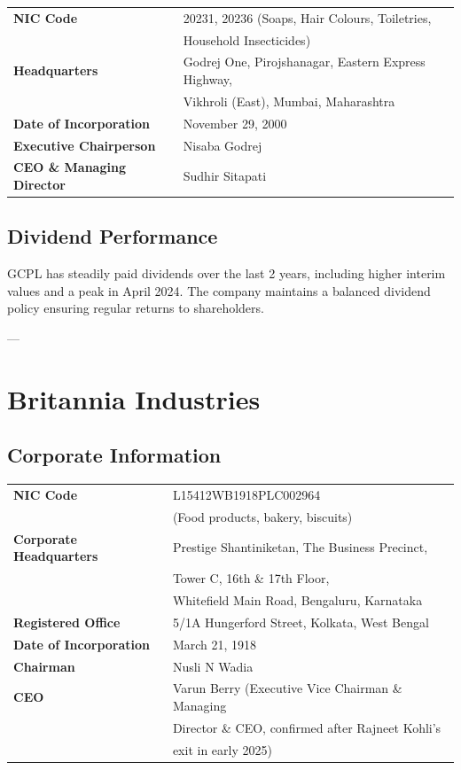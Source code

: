 \documentclass[12pt, a4paper]{report}
\begin{document}
\begin{tabular}{ll}
    \textbf{NIC Code} & 20231, 20236 (Soaps, Hair Colours, Toiletries, \\
                      & Household Insecticides) \\
    \textbf{Headquarters} & Godrej One, Pirojshanagar, Eastern Express Highway, \\
                          & Vikhroli (East), Mumbai, Maharashtra \\
    \textbf{Date of Incorporation} & November 29, 2000 \\
    \textbf{Executive Chairperson} & Nisaba Godrej \\
    \textbf{CEO \& Managing Director} & Sudhir Sitapati \\
\end{tabular}

\subsection{Dividend Performance}

GCPL has steadily paid dividends over the last 2 years, including higher interim values and a peak in April 2024. The company maintains a balanced dividend policy ensuring regular returns to shareholders.

---

\section{Britannia Industries}

\subsection{Corporate Information}

\begin{tabular}{ll}
    \textbf{NIC Code} & L15412WB1918PLC002964 \\
                      & (Food products, bakery, biscuits) \\
    \textbf{Corporate Headquarters} & Prestige Shantiniketan, The Business Precinct, \\
                                    & Tower C, 16th \& 17th Floor, \\
                                    & Whitefield Main Road, Bengaluru, Karnataka \\
    \textbf{Registered Office} & 5/1A Hungerford Street, Kolkata, West Bengal \\
    \textbf{Date of Incorporation} & March 21, 1918 \\
    \textbf{Chairman} & Nusli N Wadia \\
    \textbf{CEO} & Varun Berry (Executive Vice Chairman \& Managing \\
               & Director \& CEO, confirmed after Rajneet Kohli's \\
               & exit in early 2025) \\
\end{tabular}
\end{document}
